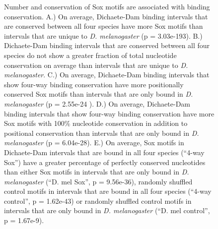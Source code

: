 \begin{figure}[H]
\centering
\caption[Number and conservation of Sox motifs are associated with binding conservation]{Number and conservation of Sox motifs are associated with binding conservation. A.) On average, Dichaete-Dam binding intervals that are conserved between all four species have more Sox motifs than intervals that are unique to \emph{D. melanogaster} (p = 3.03e-193). B.) Dichaete-Dam binding intervals that are conserved between all four species do not show a greater fraction of total nucleotide conservation on average than intervals that are unique to \emph{D. melanogaster}. C.) On average, Dichaete-Dam binding intervals that show four-way binding conservation have more positionally conserved Sox motifs than intervals that are only bound in \emph{D. melanogaster} (p = 2.55e-24 ). D.) On average, Dichaete-Dam binding intervals that show four-way binding conservation have more Sox motifs with 100\% nucleotide conservation in addition to positional conservation than intervals that are only bound in \emph{D. melanogaster} (p = 6.04e-28). E.) On average, Sox motifs in Dichaete-Dam intervals that are bound in all four species (“4-way Sox”) have a greater percentage of perfectly conserved nucleotides than either Sox motifs in intervals that are only bound in \emph{D. melanogaster} (“D. mel Sox”, p = 9.56e-36), randomly shuffled control motifs in intervals that are bound in all four species (“4-way control”, p = 1.62e-43) or randomly shuffled control motifs in intervals that are only bound in \emph{D. melanogaster} (“D. mel control”, p = 1.67e-9).}
\label{Figure 5.27}
\end{figure}

